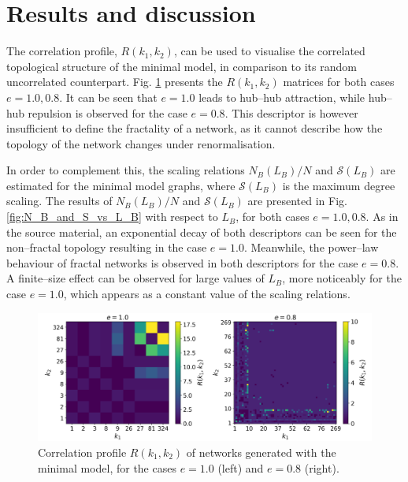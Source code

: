 \section{Results and discussion}

The correlation profile, $R(k_1,k_2)$, can be used to visualise the correlated topological structure of the minimal model, in comparison to its random uncorrelated counterpart. Fig. \ref{fig:R_k1_k2_comparison} presents the $R(k_1,k_2)$ matrices for both cases $e=1.0, 0.8$. It can be seen that $e=1.0$ leads to hub--hub attraction, while hub--hub repulsion is observed for the case $e=0.8$. This descriptor is however insufficient to define the fractality of a network, as it cannot describe how the topology of the network changes under renormalisation. 

In order to complement this, the scaling relations $N_B(L_B) / N$ and $\mathcal{S}(L_B)$ are estimated for the minimal model graphs, where $\mathcal{S}(L_B)$ is the maximum degree scaling. The results of $N_B(L_B) / N$ and $\mathcal{S}(L_B)$ are presented in Fig. \ref{fig:N_B_and_S_vs_L_B} with respect to $L_B$, for both cases $e=1.0, 0.8$. As in the source material, an exponential decay of both descriptors can be seen for the non--fractal topology resulting in the case $e=1.0$. Meanwhile, the power--law behaviour of fractal networks is observed in both descriptors for the case $e=0.8$. A finite--size effect can be observed for large values of $L_B$, more noticeably for the case $e=1.0$, which appears as a constant value of the scaling relations.

\begin{figure}[!h]
	\begin{center}
	\includegraphics[scale=0.46]{./images/task_6/R_k1_k2_comparison.png} 
	\end{center}
	\caption{Correlation profile $R(k_1, k_2)$ of networks generated with the minimal model, for the cases $e=1.0$ (left) and $e=0.8$ (right). \\} 
	\label{fig:R_k1_k2_comparison} 
\end{figure}

